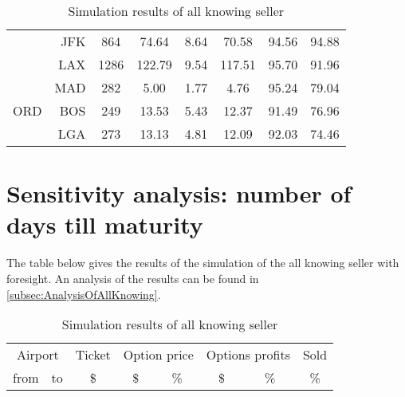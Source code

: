 \begin{table}[h]
\begin{center}
\begin{tabular}{l r c c c c c c}
~    &  JFK  &     864  &   74.64  &   8.64  &   70.58  &   94.56  &   94.88 \\
~    &  LAX  &    1286  &  122.79  &   9.54  &  117.51  &   95.70  &   91.96 \\
~    &  MAD  &     282  &    5.00  &   1.77  &    4.76  &   95.24  &   79.04 \\[.5ex]
ORD  &  BOS  &     249  &   13.53  &   5.43  &   12.37  &   91.49  &   76.96 \\
~    &  LGA  &     273  &   13.13  &   4.81  &   12.09  &   92.03  &   74.46 \\
            \bottomrule
        \end{tabular}
        \caption{Simulation results of all knowing seller}
        \label{tbl:resultsAllKnowing}
    \end{center}
\end{table}


\chapter{Sensitivity analysis: number of days till maturity}
\label{app:SensitivityMaturity}
The table below gives the results of the simulation of the all knowing seller with foresight. An analysis of the results can be found in \autoref{subsec:AnalysisOfAllKnowing}.
\\[2em]
\begin{table}[h]
    \begin{center}
        \begin{tabular}{l r c c c c c c}
            \toprule
            \multicolumn{2}{c}{Airport}  &  Ticket & \multicolumn{2}{c}{Option price} & \multicolumn{2}{c}{Options profits}  &  Sold  \\[.4ex]
            from  &  to  &  \$   &  \$  & \%  &  \$  & \%  & \%  \\
            \midrule

            \bottomrule
        \end{tabular}
        \caption{Simulation results of all knowing seller}
        \label{tbl:resultsAllKnowing}
    \end{center}
\end{table}

